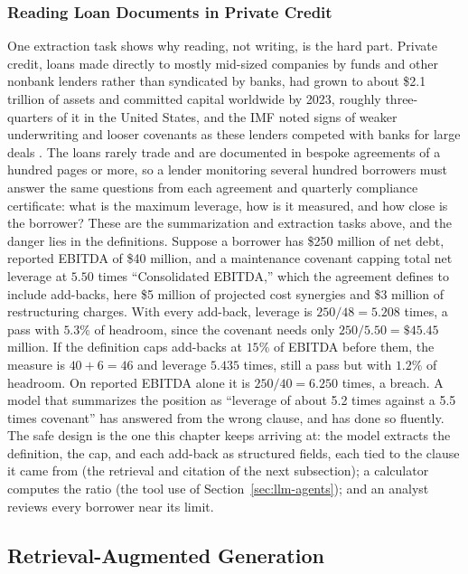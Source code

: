 \documentclass[../ai_in_finance]{subfiles}
\begin{document}
\subsubsection*{Reading Loan Documents in Private Credit}

One extraction task shows why reading, not writing, is the hard part. Private credit, loans made directly to mostly mid-sized companies by funds and other nonbank lenders rather than syndicated by banks, had grown to about \$2.1 trillion of assets and committed capital worldwide by 2023, roughly three-quarters of it in the United States, and the IMF noted signs of weaker underwriting and looser covenants as these lenders competed with banks for large deals \parencite{imf2024gfsr}. The loans rarely trade and are documented in bespoke agreements of a hundred pages or more, so a lender monitoring several hundred borrowers must answer the same questions from each agreement and quarterly compliance certificate: what is the maximum leverage, how is it measured, and how close is the borrower? These are the summarization and extraction tasks above, and the danger lies in the definitions. Suppose a borrower has \$250 million of net debt, reported EBITDA of \$40 million, and a maintenance covenant capping total net leverage at $5.50$ times ``Consolidated EBITDA,'' which the agreement defines to include add-backs, here \$5 million of projected cost synergies and \$3 million of restructuring charges. With every add-back, leverage is $250/48 = 5.208$ times, a pass with $5.3\%$ of headroom, since the covenant needs only $250/5.50 = \$45.45$ million. If the definition caps add-backs at $15\%$ of EBITDA before them, the measure is $40 + 6 = 46$ and leverage $5.435$ times, still a pass but with $1.2\%$ of headroom. On reported EBITDA alone it is $250/40 = 6.250$ times, a breach. A model that summarizes the position as ``leverage of about 5.2 times against a 5.5 times covenant'' has answered from the wrong clause, and has done so fluently. The safe design is the one this chapter keeps arriving at: the model extracts the definition, the cap, and each add-back as structured fields, each tied to the clause it came from (the retrieval and citation of the next subsection); a calculator computes the ratio (the tool use of Section~\ref{sec:llm-agents}); and an analyst reviews every borrower near its limit.

\subsection{Retrieval-Augmented Generation}
\label{sec:rag}
\end{document}
